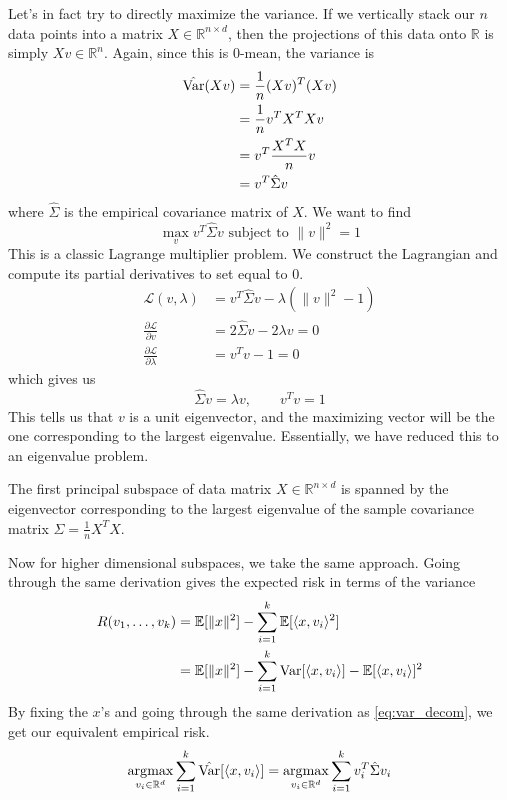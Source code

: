   Let's in fact try to directly maximize the variance. If we vertically stack our $n$ data points into a matrix $X \in \mathbb{R}^{n \times d}$, then the projections of this data onto $\mathbb{R}$ is simply $X v \in \mathbb{R}^n$. Again, since this is $0$-mean, the variance is 
  \begin{align}
    \label{eq:var_decom}
    \hat{\operatorname{Var}}(Xv) 
    & = \frac{1}{n} (Xv)^T (Xv) \\ 
    & = \frac{1}{n} v^T X^T X v \\
    & = v^T \frac{X^T X}{n} v \\ 
    & = v^T \hat{\Sigma} v
  \end{align}
  where $\hat{\Sigma}$ is the empirical covariance matrix of $X$. We want to find 
  \begin{equation}
    \max_{v} v^T \hat{\Sigma} v \text{ subject to } \|v\|^2 = 1
  \end{equation} 
  This is a classic Lagrange multiplier problem. We construct the Lagrangian and compute its partial derivatives to set equal to $0$. 
  \begin{align}
    \mathcal{L}(v, \lambda) & = v^T \hat{\Sigma} v - \lambda (\|v\|^2 - 1) \\  
    \frac{\partial \mathcal{L}}{\partial v} & = 2 \hat{\Sigma} v - 2 \lambda v = 0 \\ 
    \frac{\partial \mathcal{L}}{\partial \lambda} & = v^T v - 1 = 0
  \end{align} 
  which gives us 
  \begin{equation}
    \hat{\Sigma} v = \lambda v, \qquad v^T v = 1
  \end{equation} 
  This tells us that $v$ is a unit eigenvector, and the maximizing vector will be the one corresponding to the largest eigenvalue. Essentially, we have reduced this to an eigenvalue problem. 
  
  \begin{theorem}
    The first principal subspace of data matrix $X \in \mathbb{R}^{n \times d}$ is spanned by the eigenvector corresponding to the largest eigenvalue of the sample covariance matrix $\hat{\Sigma} = \frac{1}{n} X^T X$. 
  \end{theorem}

  Now for higher dimensional subspaces, we take the same approach. Going through the same derivation gives the expected risk in terms of the variance 
  \begin{align}
    R(v_1, \ldots, v_k) 
    & = \mathbb{E}[\|x\|^2] - \sum_{i=1}^k \mathbb{E}[ \langle x, v_i \rangle^2 ] \\ 
    & = \mathbb{E}[\|x\|^2] - \sum_{i=1}^k \operatorname{Var}[\langle x, v_i \rangle ] - \mathbb{E}[ \langle x, v_i \rangle ]^2 
  \end{align} 
  By fixing the $x$'s and going through the same derivation as \ref{eq:var_decom}, we get our equivalent empirical risk. 
  \begin{equation}
    \operatorname*{\arg\!\max}_{v_i \in \mathbb{R}^d} \sum_{i=1}^k \hat{\operatorname{Var}}[\langle x, v_i \rangle] = \operatorname*{\arg\!\max}_{v_i \in \mathbb{R}^d} \sum_{i=1}^k v_i^T \hat{\Sigma} v_i
  \end{equation}

